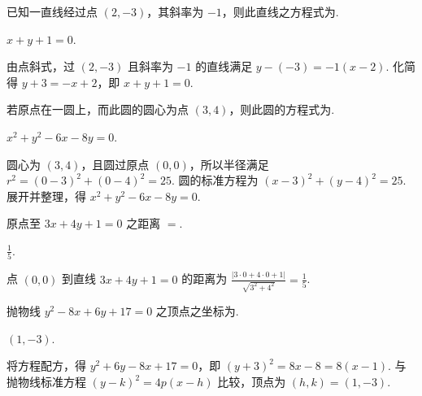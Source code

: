 \begin{problem}
已知一直线经过点 \(\left( 2,-3 \right)\)，其斜率为 \(-1\)，则此直线之方程式为\fillinblank{}.
\end{problem}

\begin{answer}
\(x + y + 1 = 0\).
\end{answer}

\begin{solution}
由点斜式，过 \((2,-3)\) 且斜率为 \(-1\) 的直线满足 \(y-(-3)=-1(x-2)\). 化简得 \(y+3=-x+2\)，即 \(x+y+1=0\).
\end{solution}

\begin{problem}
若原点在一圆上，而此圆的圆心为点 \(\left( 3,4 \right)\)，则此圆的方程式为\fillinblank{}.
\end{problem}

\begin{answer}
\(x^{2} + y^{2} - 6x - 8y = 0\).
\end{answer}

\begin{solution}
圆心为 \((3,4)\)，且圆过原点 \((0,0)\)，所以半径满足 \(r^{2}=(0-3)^{2}+(0-4)^{2}=25\). 圆的标准方程为 \((x-3)^{2}+(y-4)^{2}=25\). 展开并整理，得 \(x^{2}+y^{2}-6x-8y=0\).
\end{solution}

\begin{problem}
原点至 \(3x + 4y + 1 = 0\) 之距离 \(=\)\fillinblank{}.
\end{problem}

\begin{answer}
\(\frac{1}{5}\).
\end{answer}

\begin{solution}
点 \((0,0)\) 到直线 \(3x+4y+1=0\) 的距离为 \(\frac{|3\cdot0+4\cdot0+1|}{\sqrt{3^{2}+4^{2}}}=\frac{1}{5}\).
\end{solution}

\begin{problem}
抛物线 \(y^{2} - 8x + 6y + 17 = 0\) 之顶点之坐标为\fillinblank{}.
\end{problem}

\begin{answer}
\(\left( 1,-3 \right)\).
\end{answer}

\begin{solution}
将方程配方，得 \(y^{2}+6y-8x+17=0\)，即 \((y+3)^{2}=8x-8=8(x-1)\). 与抛物线标准方程 \((y-k)^{2}=4p(x-h)\) 比较，顶点为 \((h,k)=(1,-3)\).
\end{solution}

